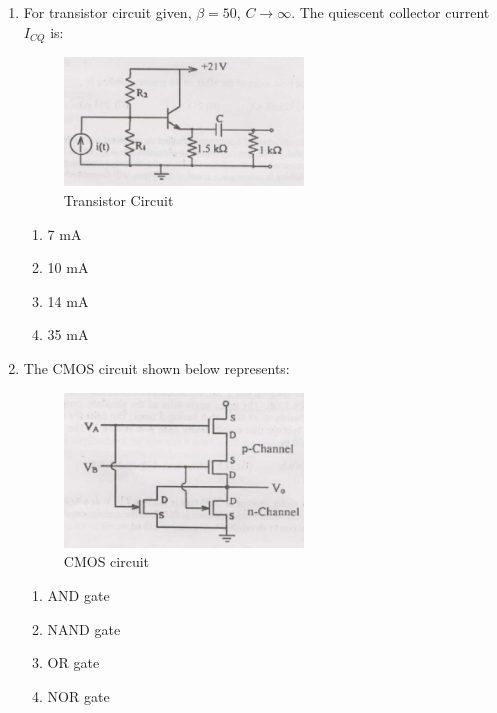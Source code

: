 \documentclass[journal,cmex10]{IEEEtran}
\theoremstyle{remark}
\numberwithin{equation}{enumi}
\numberwithin{figure}{enumi}
\begin{document}
\begin{enumerate}[label=\arabic*)]
    \item For transistor circuit given, $\beta=50$, $C \to \infty$. The quiescent collector current $I_{CQ}$ is:
    \begin{figure}[htbp]
  \centering
  \includegraphics[width=0.6\textwidth]{figs/C/fig7.png}
  \caption{Transistor Circuit}
  \label{C/fig7.png}
\end{figure}
    \bigskip
    \hfill {}
    \begin{enumerate}[label=\alph*)]
        \item 7 mA
        \item 10 mA
        \item 14 mA
        \item 35 mA
    \end{enumerate}
    \bigskip

    \item The CMOS circuit shown below represents:
    \begin{figure}[htbp]
  \centering
  \includegraphics[width=0.6\textwidth]{figs/C/fig8.png}
  \caption{CMOS circuit}
  \label{C/fig8.png}
\end{figure}
    \bigskip
    \hfill {}
    \begin{enumerate}[label=\alph*)]
        \item AND gate
        \item NAND gate
        \item OR gate
        \item NOR gate
    \end{enumerate}
    \newpage


\end{enumerate}
\end{document}

